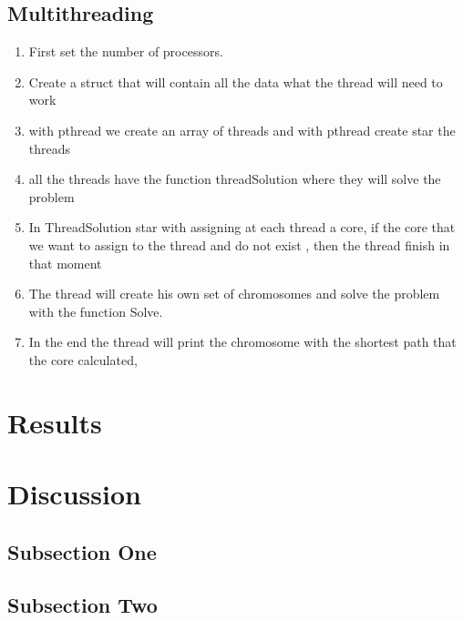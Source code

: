 \documentclass[twoside,twocolumn]{article}
\begin{document}
\subsection{Multithreading}
\begin{enumerate}
\item First set the number of processors.
\item Create a struct that will contain all the data what the thread will need to work
\item with pthread we create an array of threads and with pthread create star the threads
\item all the threads have the function threadSolution where they will solve the problem
\item In ThreadSolution star with assigning at each thread a core, if the core that we want to assign to the thread and do not exist , then the thread finish in that moment
\item The thread will create his own set of chromosomes and solve the problem with the function Solve.
\item In the end the thread will print the chromosome with the shortest path that the core calculated,
\end{enumerate}


\section{Results}



\section{Discussion}

\subsection{Subsection One}

\blindtext %

\subsection{Subsection Two}

\blindtext %

\end{document}
